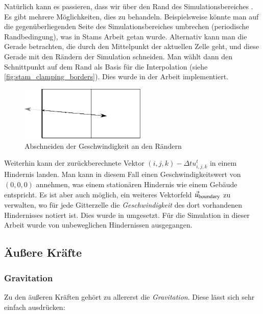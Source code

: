 Natürlich kann es passieren, dass wir über den Rand des Simulationsbereiches
. Es gibt mehrere Möglichkeiten, dies zu behandeln.
Beispielsweise könnte man auf die gegenüberliegenden Seite des
Simulationsbereiches umbrechen (periodische Randbedingung), was in Stams Arbeit
getan wurde. Alternativ kann man die Gerade betrachten, die durch den
Mittelpunkt der aktuellen Zelle geht, und diese Gerade mit den Rändern der
Simulation schneiden. Man wählt dann den Schnittpunkt auf dem Rand als Basis für
die Interpolation (siehe \autoref{fig:stam_clamping_borders}). Dies wurde in der
Arbeit implementiert.

\begin{figure}[ht]
\centering
\includegraphics[width=6cm]{images/advection_clamping_borders}
\caption{Abschneiden der Geschwindigkeit an den Rändern}
\label{fig:stam_clamping_borders}
\end{figure}

Weiterhin kann der zurückberechnete Vektor $(i,j,k) - \Delta t u_{i,j,k}^t$ in
einem Hindernis landen. Man kann in diesem Fall einen Geschwindigkeitswert
von $(0,0,0)$ annehmen, was einem stationären Hindernis wie einem Gebäude
entspricht. Es ist aber auch möglich, ein weiteres Vektorfeld
$\vec{u}_{\textnormal{boundary}}$ zu verwalten, wo für jede Gitterzelle die
\emph{Geschwindigkeit} des dort vorhandenen Hindernisses notiert ist. Dies wurde
in \cite{Crane2007} umgesetzt. Für die Simulation in dieser Arbeit wurde von
unbeweglichen Hindernissen ausgegangen.


\subsection{Äußere Kräfte}

\subsubsection{Gravitation}

Zu den äußeren Kräften gehört zu allererst die \emph{Gravitation}. Diese lässt
sich sehr einfach ausdrücken:

